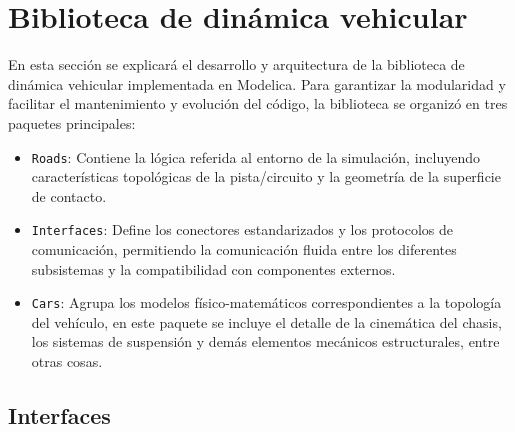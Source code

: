



\section{Biblioteca de dinámica vehicular}

En esta sección se explicará el desarrollo y arquitectura de la biblioteca de dinámica vehicular implementada en Modelica. Para garantizar la modularidad y facilitar el mantenimiento y evolución del código, la biblioteca se organizó en tres paquetes principales:


\begin{itemize}
    \item \verb|Roads|: Contiene la lógica referida al entorno de la simulación, incluyendo características topológicas de la pista/circuito y la geometría de la superficie de contacto.
    \item \verb|Interfaces|: Define los conectores estandarizados y los protocolos de comunicación, permitiendo la comunicación fluida entre los diferentes subsistemas y la compatibilidad con componentes externos.
    \item \verb|Cars|: Agrupa los modelos físico-matemáticos correspondientes a la topología del vehículo, en este paquete se incluye el detalle de la cinemática del chasis, los sistemas de suspensión y demás elementos mecánicos estructurales, entre otras cosas.
\end{itemize}

\subsection{Interfaces}


